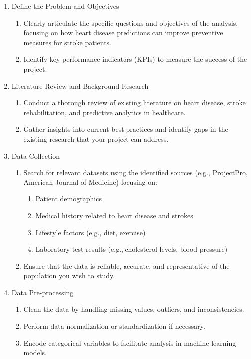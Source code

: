 \documentclass[runningheads]{llncs}
\begin{document}
\begin{enumerate}
    \item Define the Problem and Objectives
    \begin{enumerate}
        \item Clearly articulate the specific questions and objectives of the analysis, focusing on how heart disease predictions can improve preventive measures for stroke patients.
         \item Identify key performance indicators (KPIs) to measure the success of the project. 
    \end{enumerate}

\item  Literature Review and Background Research
\begin{enumerate}
    \item Conduct a thorough review of existing literature on heart disease, stroke rehabilitation, and predictive analytics in healthcare. 
    \item Gather insights into current best practices and identify gaps in the existing research that your project can address. 
\end{enumerate}

\item Data Collection
\begin{enumerate}
    \item Search for relevant datasets using the identified sources (e.g., ProjectPro, American Journal of Medicine) focusing on: 
    \begin{enumerate}
        \item Patient demographics 
        \item Medical history related to heart disease and strokes 
        \item Lifestyle factors (e.g., diet, exercise) 
        \item Laboratory test results (e.g., cholesterol levels, blood pressure) 
    \end{enumerate}
    \item Ensure that the data is reliable, accurate, and representative of the population you wish to study. 
\end{enumerate}

\item Data Pre-processing
    \begin{enumerate}
        \item Clean the data by handling missing values, outliers, and inconsistencies. 
        \item Perform data normalization or standardization if necessary. 
        \item Encode categorical variables to facilitate analysis in machine learning models. 
    \end {enumerate}
    

\end{enumerate}
\end{document}
